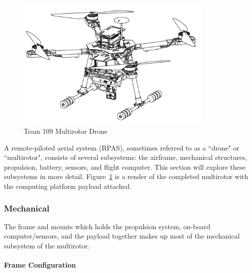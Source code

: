 \begin{figure}[H]
	\centering
	\includegraphics[width=0.85\textwidth]{img/multirotor.png}
	\caption[Team 109 Multirotor Drone]{Team 109 Multirotor Drone}
	\label{fig:drone1}
\end{figure}

A remote-piloted aerial system (RPAS), sometimes referred to as a ``drone" or ``multirotor", consists of several subsystems: the airframe, mechanical structures, propulsion, battery, sensors, and flight computer. This section will explore these subsystems in more detail. Figure~\ref{fig:drone1} is a render of the completed multirotor with the computing platform payload attached.

\subsubsection{Mechanical}\label{section:drone-mech}

The frame and mounts which holds the propulsion system, on-board computer/sensors, and the payload together makes up most of the mechanical subsystem of the multirotor.

\paragraph{Frame Configuration}

